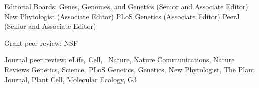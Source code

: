 \documentclass[letterpaper,10pt]{article}
\newcommand{\ignore}[1]{}
\renewenvironment{itemize}{
  \begin{list}{}{
    \setlength{\leftmargin}{1.5em}
  }
}{
  \end{list}
}
\begin{document}
\begin{itemize}
\item Editorial Boards:
Genes, Genomes, and Genetics (Senior and Associate Editor)%
New Phytologist (Associate Editor) %
PLoS Genetics (Associate Editor)%
PeerJ (Senior and Associate Editor)%
\item Grant peer review: NSF \ignore{1/21}
\item Journal peer review: \ignore{1/19,11/19} eLife,  \ignore{2/20} Cell, \ignore{1/21}\ Nature, \ignore{7/19,7/20} Nature Communications, \ignore{2/19} Nature Reviews Genetics,   \ignore{7/19} Science, \ignore{8/19} PLoS Genetics, \ignore{1/21} Genetics, \ignore{ 7/19} New Phytologist, \ignore{1/21} The Plant Journal, \ignore{4/20} Plant Cell, \ignore{7/19} Molecular Ecology, G3

\end{itemize}
\end{document}
